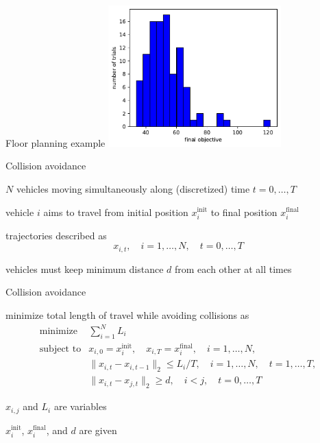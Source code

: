 \documentclass[aspectratio=169,11pt]{beamer}
\begin{document}
\begin{frame}{Floor planning example}
\centering
\includegraphics[width=0.5\textwidth]{floor_planning_hist.pdf}
\end{frame}

\begin{frame}{Collision avoidance}
\BIT 
\item $N$ vehicles moving simultaneously along (discretized) time $t = 0, \ldots, T$
\item vehicle $i$ aims to travel from initial position $x_i^\text{init}$
to final position $x_i^\text{final}$
\item trajectories described as
\[
x_{i,t}, \quad i = 1, \ldots, N, \quad t = 0, \ldots, T
\]
\item vehicles must keep minimum distance $d$ from each other at all times
\EIT
\end{frame}

\begin{frame}{Collision avoidance}
\BIT
\item minimize total length of travel while avoiding collisions as
\[
\begin{array}{ll}
\mbox{minimize} & \sum_{i=1}^{N} L_i\\
\mbox{subject to} & x_{i, 0} = x_i^\text{init}, \quad x_{i, T} = x_i^\text{final},
\quad i = 1, \ldots, N, \\
& \|x_{i, t} - x_{i, t-1}\|_2 \leq L_i/T, \quad i = 1, \ldots, N, \quad t = 1, \ldots, T, \\
& \|x_{i, t} - x_{j, t}\|_2 \geq d, \quad i < j, \quad t = 0, \ldots, T
\end{array}
\]
\item $x_{i,j}$ and $L_i$ are variables
\item  $x_i^\text{init}$,  $x_i^\text{final}$, and $d$ are given
\EIT
\end{frame}
\end{document}
